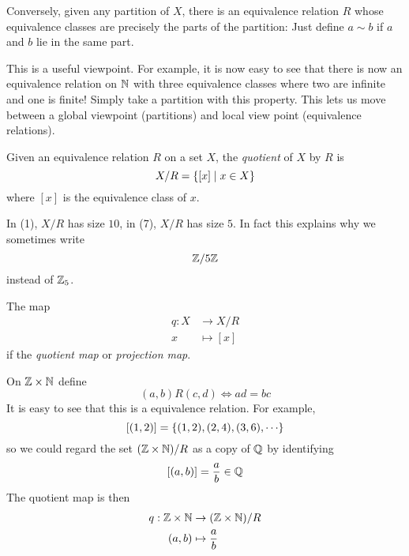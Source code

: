 \documentclass{article}
\begin{document}
Conversely, given any partition of $X$, there is an equivalence relation $R$ whose equivalence classes are precisely the parts of the partition:
Just define $a \sim b$ if $a$ and $b$ lie in the same part.

\begin{remark}
    This is a useful viewpoint. 
    For example, it is now easy to see that there is now an equivalence relation on $\mathbb{N}$ with three equivalence classes where two are infinite and one is finite!
    Simply take a partition with this property.
    This lets us move between a global viewpoint (partitions) and local view point (equivalence relations).
\end{remark}

\begin{defi}[Quotient]
    Given an equivalence relation $R$ on a set $X$, the \emph{quotient} of $X$ by $R$ is 
    \[
        X / R = \left\{ [x] \mid x \in X \right\}   
    \]
    where $[x]$ is the equivalence class of $x$.
\end{defi}
\begin{eg}
    In (1), $X / R$ has size $10$, in (7), $X / R$ has size $5$.
    In fact this explains why we sometimes write
    \[
        \mathbb{Z} / 5\mathbb{Z}  
    \]
    instead of $\mathbb{Z}_5$.
\end{eg}

\begin{defi}
    The map
    \begin{align*}
        q : X &\rightarrow X / R \\
        x &\mapsto [x]
    \end{align*}
    if the \emph{quotient map} or \emph{projection map}.
\end{defi}

\begin{eg}
    On $\mathbb{Z} \times \mathbb{N}$ define
    \[
        (a, b)R(c, d) \Longleftrightarrow ad = bc
    \]
    It is easy to see that this is a equivalence relation.
    For example,
    \[
        [(1, 2)] = \crbkt{(1, 2), (2, 4), (3, 6), \cdots}  
    \]
    so we could regard the set $(\mathbb{Z} \times \mathbb{N}) / R$ as a copy of $\mathbb{Q}$ by identifying
    \[
        [(a, b)] = \frac{a}{b} \in \mathbb{Q}
    \]
    The quotient map is then
    \begin{align*}
        q : \mathbb{Z} \times \mathbb{N} &\rightarrow (\mathbb{Z} \times \mathbb{N}) / R \\
        (a, b) &\mapsto \frac{a}{b}
    \end{align*}
\end{eg}
\end{document}
